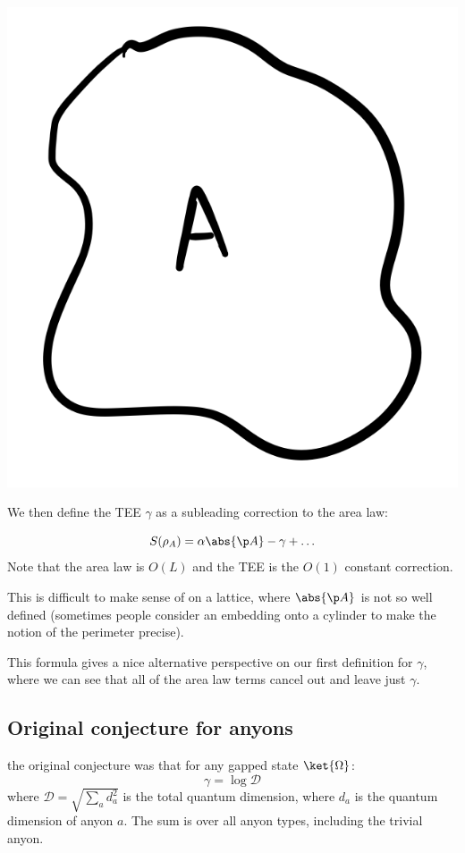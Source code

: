 \begin{center}
    \includegraphics[scale=0.35]{Lectures/Images/lec17-regionA.png}
\end{center}
We then define the TEE $\gamma$ as a subleading correction to the area law:

\begin{equation}
    S(\rho_A) = \alpha\abs{\p A} - \gamma + \ldots
\end{equation}
Note that the area law is $O(L)$ and the TEE is the $O(1)$ constant correction.

This is difficult to make sense of on a lattice, where $\abs{\p A}$ is not so well defined (sometimes people consider an embedding onto a cylinder to make the notion of the perimeter precise).

This formula gives a nice alternative perspective on our first definition for $\gamma$, where we can see that all of the area law terms cancel out and leave just $\gamma$.

\subsection{Original conjecture for anyons}
the original conjecture was that for any gapped state $\ket{\Omega}$:
\begin{equation}
    \gamma = \log \mathcal{D}
\end{equation}
where $\mathcal{D} = \sqrt{\sum_a d_a^2}$ is the total quantum dimension, where $d_a$ is the quantum dimension of anyon $a$. The sum is over all anyon types, including the trivial anyon.


